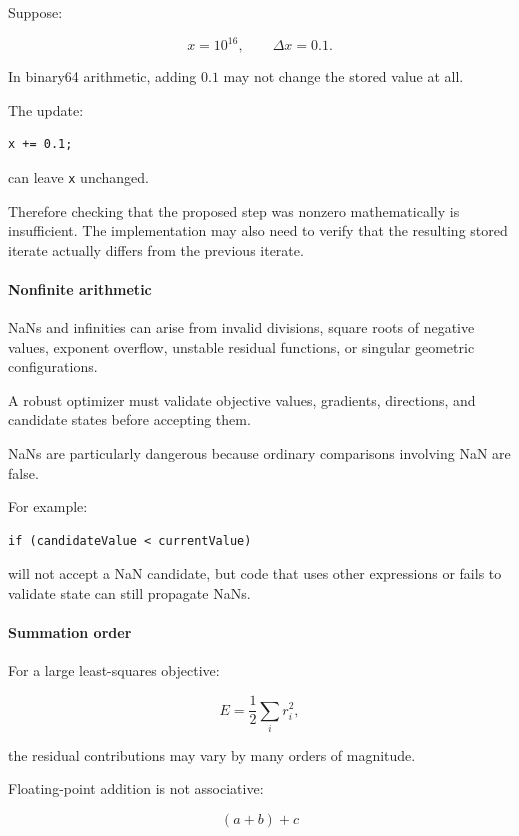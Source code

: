 Suppose:

\[
x=10^{16}, \qquad \Delta x=0.1.
\]

In binary64 arithmetic, adding \(0.1\) may not change the stored value at all.

The update:

\begin{verbatim}
x += 0.1;
\end{verbatim}

can leave \texttt{x} unchanged.

Therefore checking that the proposed step was nonzero mathematically is insufficient. The implementation may also need to verify that the resulting stored iterate actually differs from the previous iterate.

\paragraph{Nonfinite arithmetic}\label{02-foundations-ii-ch027-nonfinite-arithmetic}

NaNs and infinities can arise from invalid divisions, square roots of negative values, exponent overflow, unstable residual functions, or singular geometric configurations.

A robust optimizer must validate objective values, gradients, directions, and candidate states before accepting them.

NaNs are particularly dangerous because ordinary comparisons involving NaN are false.

For example:

\begin{verbatim}
if (candidateValue < currentValue)
\end{verbatim}

will not accept a NaN candidate, but code that uses other expressions or fails to validate state can still propagate NaNs.

\paragraph{Summation order}\label{02-foundations-ii-ch027-summation-order}

For a large least-squares objective:

\[
E=\frac12\sum_i r_i^2,
\]

the residual contributions may vary by many orders of magnitude.

Floating-point addition is not associative:

\[
(a+b)+c
\]

